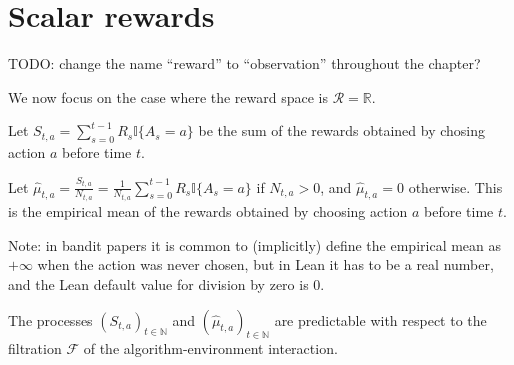 


\section{Scalar rewards}

TODO: change the name ``reward'' to ``observation'' throughout the chapter?

We now focus on the case where the reward space is $\mathcal{R} = \mathbb{R}$.


\begin{definition}\label{def:sumRewards}
  \leanok
Let $S_{t, a} = \sum_{s=0}^{t-1} R_s \mathbb{I}\{A_s = a\}$ be the sum of the rewards obtained by chosing action $a$ before time $t$.
\end{definition}


\begin{definition}\label{def:empMean}
  \leanok
Let $\hat{\mu}_{t, a} = \frac{S_{t, a}}{N_{t, a}} = \frac{1}{N_{t,a}} \sum_{s=0}^{t-1} R_s \mathbb{I}\{A_s = a\}$ if $N_{t, a} > 0$, and $\hat{\mu}_{t, a} = 0$ otherwise.
This is the empirical mean of the rewards obtained by choosing action $a$ before time $t$.
\end{definition}

Note: in bandit papers it is common to (implicitly) define the empirical mean as $+\infty$ when the action was never chosen, but in Lean it has to be a real number, and the Lean default value for division by zero is $0$.


\begin{lemma}\label{lem:isPredictable_sumRewards}
  \leanok
The processes $(S_{t,a})_{t \in \mathbb{N}}$ and $(\hat{\mu}_{t,a})_{t \in \mathbb{N}}$ are predictable with respect to the filtration $\mathcal{F}$ of the algorithm-environment interaction.
\end{lemma}

